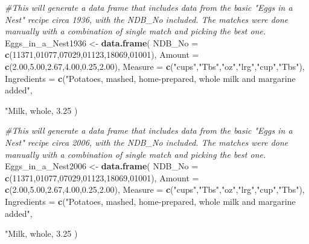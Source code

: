 \documentclass[]{article}
\newenvironment{Shaded}{\begin{snugshade}}{\end{snugshade}}
\newcommand{\KeywordTok}[1]{\textcolor[rgb]{0.13,0.29,0.53}{\textbf{#1}}}
\newcommand{\DataTypeTok}[1]{\textcolor[rgb]{0.13,0.29,0.53}{#1}}
\newcommand{\DecValTok}[1]{\textcolor[rgb]{0.00,0.00,0.81}{#1}}
\newcommand{\FloatTok}[1]{\textcolor[rgb]{0.00,0.00,0.81}{#1}}
\newcommand{\StringTok}[1]{\textcolor[rgb]{0.31,0.60,0.02}{#1}}
\newcommand{\CommentTok}[1]{\textcolor[rgb]{0.56,0.35,0.01}{\textit{#1}}}
\newcommand{\NormalTok}[1]{#1}
\begin{document}
\begin{Shaded}
\begin{Highlighting}[]
\CommentTok{#This will generate a data frame that includes data from the basic "Eggs in a Nest" recipe circa 1936, with the NDB_No included.  The matches were done manually with a combination of single match and picking the best one.}
\NormalTok{Eggs_in_a_Nest1936 <-}\StringTok{ }\KeywordTok{data.frame}\NormalTok{(}
  \DataTypeTok{NDB_No =} \KeywordTok{c}\NormalTok{(}\DecValTok{11371}\NormalTok{,}\DecValTok{01077}\NormalTok{,}\DecValTok{07029}\NormalTok{,}\DecValTok{01123}\NormalTok{,}\DecValTok{18069}\NormalTok{,}\DecValTok{01001}\NormalTok{),}
  \DataTypeTok{Amount =} \KeywordTok{c}\NormalTok{(}\FloatTok{2.00}\NormalTok{,}\FloatTok{5.00}\NormalTok{,}\FloatTok{2.67}\NormalTok{,}\FloatTok{4.00}\NormalTok{,}\FloatTok{0.25}\NormalTok{,}\FloatTok{2.00}\NormalTok{),}
  \DataTypeTok{Measure =} \KeywordTok{c}\NormalTok{(}\StringTok{"cups"}\NormalTok{,}\StringTok{"Tbs"}\NormalTok{,}\StringTok{"oz"}\NormalTok{,}\StringTok{"lrg"}\NormalTok{,}\StringTok{"cup"}\NormalTok{,}\StringTok{"Tbs"}\NormalTok{),}
  \DataTypeTok{Ingredients =} \KeywordTok{c}\NormalTok{(}\StringTok{"Potatoes, mashed, home-prepared, whole milk and margarine added"}\NormalTok{,}\StringTok{"Milk, whole, 3.25% milkfat, without added vitamin A and vitamin D"}\NormalTok{,}\StringTok{"Ham, sliced, regular (approximately 11% fat)"}\NormalTok{,}\StringTok{"Egg, whole, raw, fresh"}\NormalTok{,}\StringTok{"Bread, white, commercially prepared (includes soft bread crumbs)"}\NormalTok{,}\StringTok{"Butter, salted"}\NormalTok{)}
\NormalTok{)}

\CommentTok{#This will generate a data frame that includes data from the basic "Eggs in a Nest" recipe circa 2006, with the NDB_No included.  The matches were done manually with a combination of single match and picking the best one.}
\NormalTok{Eggs_in_a_Nest2006 <-}\StringTok{ }\KeywordTok{data.frame}\NormalTok{(}
  \DataTypeTok{NDB_No =} \KeywordTok{c}\NormalTok{(}\DecValTok{11371}\NormalTok{,}\DecValTok{01077}\NormalTok{,}\DecValTok{07029}\NormalTok{,}\DecValTok{01123}\NormalTok{,}\DecValTok{18069}\NormalTok{,}\DecValTok{01001}\NormalTok{),}
  \DataTypeTok{Amount =} \KeywordTok{c}\NormalTok{(}\FloatTok{2.00}\NormalTok{,}\FloatTok{5.00}\NormalTok{,}\FloatTok{2.67}\NormalTok{,}\FloatTok{4.00}\NormalTok{,}\FloatTok{0.25}\NormalTok{,}\FloatTok{2.00}\NormalTok{),}
  \DataTypeTok{Measure =} \KeywordTok{c}\NormalTok{(}\StringTok{"cups"}\NormalTok{,}\StringTok{"Tbs"}\NormalTok{,}\StringTok{"oz"}\NormalTok{,}\StringTok{"lrg"}\NormalTok{,}\StringTok{"cup"}\NormalTok{,}\StringTok{"Tbs"}\NormalTok{),}
  \DataTypeTok{Ingredients =} \KeywordTok{c}\NormalTok{(}\StringTok{"Potatoes, mashed, home-prepared, whole milk and margarine added"}\NormalTok{,}\StringTok{"Milk, whole, 3.25% milkfat, without added vitamin A and vitamin D"}\NormalTok{,}\StringTok{"Ham, sliced, regular (approximately 11% fat)"}\NormalTok{,}\StringTok{"Egg, whole, raw, fresh"}\NormalTok{,}\StringTok{"Bread, white, commercially prepared (includes soft bread crumbs)"}\NormalTok{,}\StringTok{"Butter, salted"}\NormalTok{)}
\NormalTok{  )}


}}
\end{Highlighting}
\end{Shaded}
\end{document}
